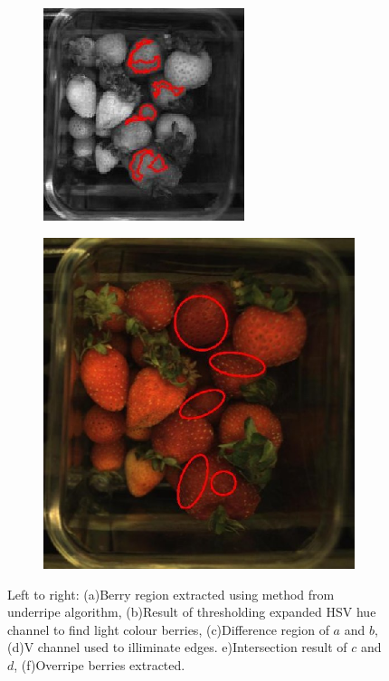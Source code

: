 \documentclass[conference]{IEEEtran}
\begin{document}
\begin{figure}[ht]
	\begin{subfigure}{.25\textwidth}
		\centering
		\includegraphics[width=.9\linewidth]{eps/over_light_diff.eps}
		\caption{}
		\label{fig:over_light_diff}
	\end{subfigure}%
	\begin{subfigure}{.25\textwidth}
		\centering
		\includegraphics[width=.9\linewidth]{eps/over_result.eps}
		\caption{}
		\label{fig:over_result}
	\end{subfigure}%
	
	\caption{Left to right: (a)Berry region extracted using method from underripe algorithm, (b)Result of thresholding expanded HSV hue channel to find light colour berries, (c)Difference region of $a$ and $b$, (d)V channel used to illiminate edges. e)Intersection result of $c$ and $d$, (f)Overripe berries extracted.}
	\label{fig:overripe_process}
\end{figure} 
\end{document}
